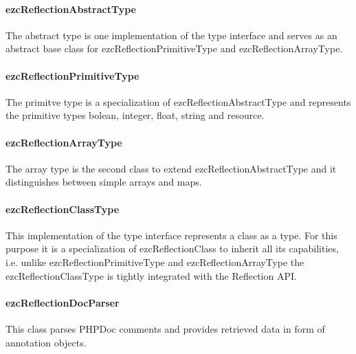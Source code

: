 \documentclass[10pt,final,a4paper,oneside]{article}
\begin{document}
\paragraph{ezcReflectionAbstractType}
The abstract type is one implementation of the type interface
and serves as an abstract base class
for ezcReflectionPrimitiveType and
ezcReflectionArrayType.

\paragraph{ezcReflectionPrimitiveType}
The primitve type is a specialization 
of ezcReflectionAbstractType
and represents the primitive types
bolean, integer, float, string and resource.

\paragraph{ezcReflectionArrayType}
The array type is the second class
to extend ezcReflectionAbstractType
and it distinguishes
between simple arrays and maps.

\paragraph{ezcReflectionClassType}
This implementation of the type interface
represents a class as a type.
For this purpose it is a specialization of ezcReflectionClass
to inherit all its capabilities,
i.e. unlike ezcReflectionPrimitiveType and ezcReflectionArrayType
the ezcReflectionClassType is tightly integrated with the Reflection API.


\paragraph{ezcReflectionDocParser}
This class parses PHPDoc comments
and provides retrieved data
in form of annotation objects.
\end{document}
